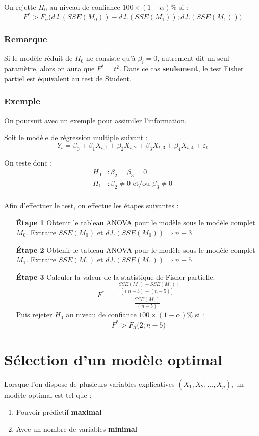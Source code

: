 \documentclass[11pt,french]{report}
\begin{document}
On rejette $H_0$ au niveau de confiance $100 \times (1 - \alpha)\%$ si :
$$
F^* > F_{\alpha}\Big( d.l.(SSE(M_0)) - d.l.(SSE(M_1)); d.l.(SSE(M_1)) \Big)
$$

\subsubsection*{Remarque}
Si le modèle réduit de $H_0$ ne consiste qu'à $\beta_i =0$, autrement dit un seul paramètre, alors on aura que $F^* = t^2$. Dans ce cas \textbf{seulement}, le test Fisher partiel est équivalent au test de Student.

\subsubsection*{Exemple}
On poursuit avec un exemple pour assimiler l'information. \newline

Soit le modèle de régression multiple suivant :
$$
Y_t = \beta_0 + \beta_1X_{t,1} + \beta_2X_{t,2} + \beta_3X_{t,3} + \beta_4X_{t,4} + \varepsilon_t
$$

On teste donc :
\begin{align*}
H_0 &: \beta_2 = \beta_3 = 0 \\
H_1 &: \beta_2 \neq 0 \text{ et/ou } \beta_3 \neq 0 \\
\end{align*}

Afin d'effectuer le test, on effectue les étapes suivantes :
\begin{itemize}
\item[\textbf{Étape 1}] Obtenir le tableau ANOVA pour le modèle sous le modèle complet $M_0$. Extraire $SSE(M_0)$ et $d.l.(SSE(M_0)) \Rightarrow n - 3$

\item[\textbf{Étape 2}] Obtenir le tableau ANOVA pour le modèle sous le modèle complet $M_1$. Extraire $SSE(M_1)$ et $d.l.(SSE(M_1)) \Rightarrow n - 5$ 

\item[\textbf{Étape 3}] Calculer la valeur de la statistique de Fisher partielle.
$$
F^* = \frac{\frac{[SSE(M_0) - SSE(M_1)]}{[(n-3) - (n-5)]}}{\frac{SSE(M_1)}{(n-5)}}
$$
Puis rejeter $H_0$ au niveau de confiance $100 \times (1 - \alpha)\%$ si :
$$
F^* > F_{\alpha}\Big( 2; n-5 \Big)
$$
\end{itemize}

\section{Sélection d'un modèle optimal}
\label{sec:optimal}
Lorsque l'on dispose de plusieurs variables explicatives $(X_1,X_2,...,X_p)$, un modèle optimal est tel que :
\begin{enumerate}
\item Pouvoir prédictif \textbf{maximal}
\item Avec un nombre de variables \textbf{minimal}
\end{enumerate}
\end{document}
